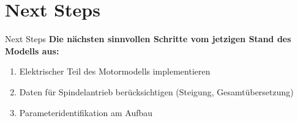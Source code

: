 \documentclass[10pt,xcolor=dvipsnames]{beamer}
\begin{document}
\section{Next Steps}
	\begin{frame}{Next Steps}
		\textbf{Die nächsten sinnvollen Schritte vom jetzigen Stand des Modells aus:}
		\begin{enumerate}
			\item Elektrischer Teil des Motormodells implementieren
			\item Daten für Spindelantrieb berücksichtigen (Steigung, Gesamtübersetzung)
			\item Parameteridentifikation am Aufbau
		\end{enumerate}
	\end{frame}

\end{document}
